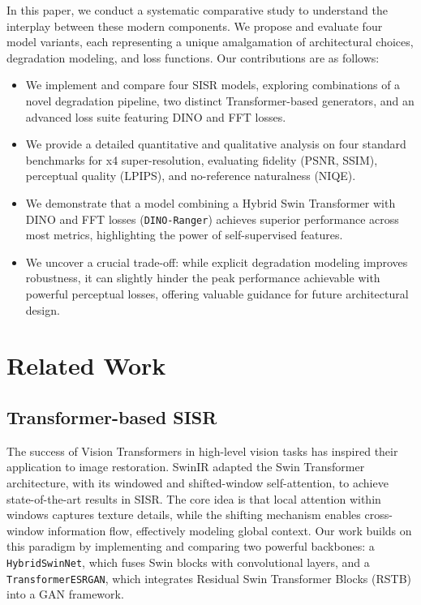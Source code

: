 \documentclass[10pt,twocolumn,letterpaper]{article}
\begin{document}
In this paper, we conduct a systematic comparative study to understand the interplay between these modern components. We propose and evaluate four model variants, each representing a unique amalgamation of architectural choices, degradation modeling, and loss functions. Our contributions are as follows:
\begin{itemize}
    \item We implement and compare four SISR models, exploring combinations of a novel degradation pipeline, two distinct Transformer-based generators, and an advanced loss suite featuring DINO and FFT losses.
    \item We provide a detailed quantitative and qualitative analysis on four standard benchmarks for x4 super-resolution, evaluating fidelity (PSNR, SSIM), perceptual quality (LPIPS), and no-reference naturalness (NIQE).
    \item We demonstrate that a model combining a Hybrid Swin Transformer with DINO and FFT losses (\texttt{DINO-Ranger}) achieves superior performance across most metrics, highlighting the power of self-supervised features.
    \item We uncover a crucial trade-off: while explicit degradation modeling improves robustness, it can slightly hinder the peak performance achievable with powerful perceptual losses, offering valuable guidance for future architectural design.
\end{itemize}

\section{Related Work}
\label{sec:related_work}

\subsection{Transformer-based SISR}
The success of Vision Transformers \cite{dosovitskiy2020image} in high-level vision tasks has inspired their application to image restoration. SwinIR \cite{liang2021swinir} adapted the Swin Transformer architecture, with its windowed and shifted-window self-attention, to achieve state-of-the-art results in SISR. The core idea is that local attention within windows captures texture details, while the shifting mechanism enables cross-window information flow, effectively modeling global context. Our work builds on this paradigm by implementing and comparing two powerful backbones: a \texttt{HybridSwinNet}, which fuses Swin blocks with convolutional layers, and a \texttt{TransformerESRGAN}, which integrates Residual Swin Transformer Blocks (RSTB) into a GAN framework.
\end{document}
